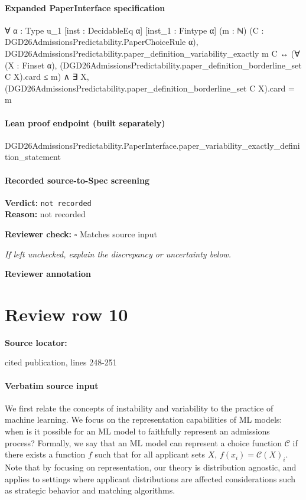 \documentclass[10pt]{article}
\newcommand{\reviewerbox}{%
  \par\noindent\fbox{\parbox{0.96\linewidth}{\rule{0pt}{0.38in}}}\par
}
\newcommand{\reviewmatch}[1]{%
  \par\noindent\textbf{Reviewer check:} $\square$\; #1\par
  \noindent\emph{If left unchecked, explain the discrepancy or uncertainty below.}\par
}
\begin{document}
\paragraph{Expanded PaperInterface specification}
\begin{ReviewVerbatim}
∀ {α : Type u_1} [inst : DecidableEq α] [inst_1 : Fintype α] (m : ℕ)
  (C : DGD26AdmissionsPredictability.PaperChoiceRule α),
  DGD26AdmissionsPredictability.paper_definition_variability_exactly m C ↔
    (∀ (X : Finset α), (DGD26AdmissionsPredictability.paper_definition_borderline_set C X).card ≤ m) ∧
      ∃ X, (DGD26AdmissionsPredictability.paper_definition_borderline_set C X).card = m
\end{ReviewVerbatim}

\paragraph{Lean proof endpoint (built separately)}\begin{ReviewVerbatim}
DGD26AdmissionsPredictability.PaperInterface.paper_variability_exactly_definition_statement
\end{ReviewVerbatim}

\paragraph{Recorded source-to-Spec screening}
\textbf{Verdict:} \texttt{not recorded}
\\
\textbf{Reason:} not recorded
\reviewmatch{Matches source input}
\noindent\textbf{Reviewer annotation}\par
\reviewerbox
\clearpage
\hypertarget{source-claim-12cc974d07b19ac2}{}
\section*{Review row 10}
\textbf{Source locator:} {\footnotesize\raggedright cited publication, lines 248-\allowbreak{}251\par}
\paragraph{Verbatim source input}
\begin{ReviewVerbatim}
We first relate the concepts of instability and variability to the practice of machine learning.
We focus on the representation capabilities of ML models: when is it possible for an ML model to faithfully represent an admissions process?
Formally, we say that an ML model can represent a choice function $\mathcal C$ if there exists a function $f$ such that for all applicant sets $X$, $f(x_i) = \mathcal C(X)_i$.
{Note that by focusing on representation, our theory is distribution agnostic, and applies to settings where applicant distributions are affected considerations such as strategic behavior and matching algorithms.}
\end{ReviewVerbatim}
\end{document}
